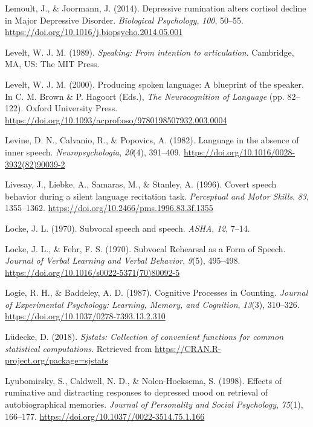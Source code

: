 \documentclass[a4paper,12pt,twoside,openright,oldfontcommands]{memoir}
\begin{document}
\leavevmode\hypertarget{ref-Lemoult2014}{}%
Lemoult, J., \& Joormann, J. (2014). Depressive rumination alters cortisol decline in Major Depressive Disorder. \emph{Biological Psychology}, \emph{100}, 50--55. \url{https://doi.org/10.1016/j.biopsycho.2014.05.001}

\leavevmode\hypertarget{ref-levelt_speaking:_1989}{}%
Levelt, W. J. M. (1989). \emph{Speaking: From intention to articulation}. Cambridge, MA, US: The MIT Press.

\leavevmode\hypertarget{ref-brown_producing_2000}{}%
Levelt, W. J. M. (2000). Producing spoken language: A blueprint of the speaker. In C. M. Brown \& P. Hagoort (Eds.), \emph{The Neurocognition of Language} (pp. 82--122). Oxford University Press. \url{https://doi.org/10.1093/acprof:oso/9780198507932.003.0004}

\leavevmode\hypertarget{ref-levine_language_1982}{}%
Levine, D. N., Calvanio, R., \& Popovics, A. (1982). Language in the absence of inner speech. \emph{Neuropsychologia}, \emph{20}(4), 391--409. \url{https://doi.org/10.1016/0028-3932(82)90039-2}

\leavevmode\hypertarget{ref-livesay_covert_1996}{}%
Livesay, J., Liebke, A., Samaras, M., \& Stanley, A. (1996). Covert speech behavior during a silent language recitation task. \emph{Perceptual and Motor Skills}, \emph{83}, 1355--1362. \url{https://doi.org/10.2466/pms.1996.83.3f.1355}

\leavevmode\hypertarget{ref-locke_subvocal_1970-1}{}%
Locke, J. L. (1970). Subvocal speech and speech. \emph{ASHA}, \emph{12}, 7--14.

\leavevmode\hypertarget{ref-locke_subvocal_1970}{}%
Locke, J. L., \& Fehr, F. S. (1970). Subvocal Rehearsal as a Form of Speech. \emph{Journal of Verbal Learning and Verbal Behavior}, \emph{9}(5), 495--498. \url{https://doi.org/10.1016/s0022-5371(70)80092-5}

\leavevmode\hypertarget{ref-logie_cognitive_1987}{}%
Logie, R. H., \& Baddeley, A. D. (1987). Cognitive Processes in Counting. \emph{Journal of Experimental Psychology: Learning, Memory, and Cognition}, \emph{13}(3), 310--326. \url{https://doi.org/10.1037/0278-7393.13.2.310}

\leavevmode\hypertarget{ref-R-sjstats}{}%
Lüdecke, D. (2018). \emph{Sjstats: Collection of convenient functions for common statistical computations}. Retrieved from \url{https://CRAN.R-project.org/package=sjstats}

\leavevmode\hypertarget{ref-Lyubomirsky1998}{}%
Lyubomirsky, S., Caldwell, N. D., \& Nolen-Hoeksema, S. (1998). Effects of ruminative and distracting responses to depressed mood on retrieval of autobiographical memories. \emph{Journal of Personality and Social Psychology}, \emph{75}(1), 166--177. \url{https://doi.org/10.1037//0022-3514.75.1.166}
\end{document}
